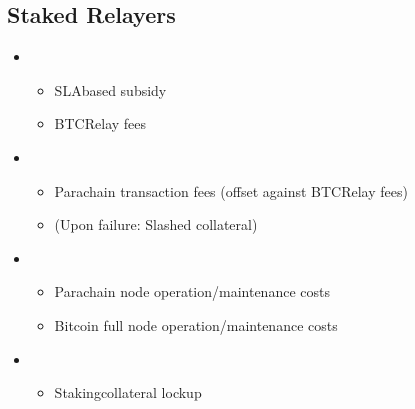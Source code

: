\documentclass[a4paper,10pt,english]{sphinxmanual}
\begin{document}
\subsection{Staked Relayers}
\label{\detokenize{economics/fees:staked-relayers}}\begin{itemize}
\item {} 
\begin{itemize}
\item {} 
SLA\sphinxhyphen{}based subsidy

\item {} 
BTC\sphinxhyphen{}Relay fees

\end{itemize}

\item {} 
\begin{itemize}
\item {} 
Parachain transaction fees (offset against BTC\sphinxhyphen{}Relay fees)

\item {} 
(Upon failure: Slashed collateral)

\end{itemize}

\item {} 
\begin{itemize}
\item {} 
Parachain node operation/maintenance costs

\item {} 
Bitcoin full node operation/maintenance costs

\end{itemize}

\item {} 
\begin{itemize}
\item {} 
Staking\sphinxhyphen{}collateral lockup

\end{itemize}

\end{itemize}
\end{document}
